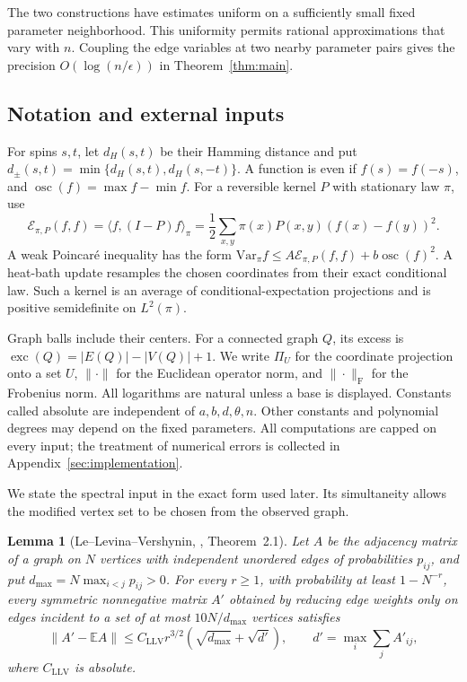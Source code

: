 \documentclass[11pt]{article}
\newcommand{\Var}{\mathrm{Var}}
\def\E{\mathbb{E}}
\newtheorem{lemma}[thm]{Lemma}
\numberwithin{equation}{section}
\begin{document}
The two constructions have estimates uniform on a sufficiently small fixed parameter neighborhood. This uniformity permits rational approximations that vary with $n$. Coupling the edge variables at two nearby parameter pairs gives the precision $O(\log(n/\epsilon))$ in Theorem~\ref{thm:main}.

\subsection{Notation and external inputs}

For spins $s,t$, let $d_H(s,t)$ be their Hamming distance and put
$d_\pm(s,t)=\min\{d_H(s,t),d_H(s,-t)\}$. A function is even if $f(s)=f(-s)$, and $\operatorname{osc}(f)=\max f-\min f$. For a reversible kernel $P$ with stationary law $\pi$, use
\[
 \mathcal E_{\pi,P}(f,f)
 =\langle f,(I-P)f\rangle_\pi
 =\frac12\sum_{x,y}\pi(x)P(x,y)(f(x)-f(y))^2.
\]
A weak Poincar\'e inequality has the form
$\Var_\pi f\le A\mathcal E_{\pi,P}(f,f)+b\operatorname{osc}(f)^2$.
A heat-bath update resamples the chosen coordinates from their exact conditional law. Such a kernel is an average of conditional-expectation projections and is positive semidefinite on $L^2(\pi)$.

Graph balls include their centers. For a connected graph $Q$, its excess is $\operatorname{exc}(Q)=|E(Q)|-|V(Q)|+1$. We write $\Pi_U$ for the coordinate projection onto a set $U$, $\|\cdot\|$ for the Euclidean operator norm, and $\|\cdot\|_{\mathrm F}$ for the Frobenius norm. All logarithms are natural unless a base is displayed. Constants called absolute are independent of $a,b,d,\theta,n$. Other constants and polynomial degrees may depend on the fixed parameters. All computations are capped on every input; the treatment of numerical errors is collected in Appendix~\ref{sec:implementation}.

We state the spectral input in the exact form used later. Its simultaneity allows the modified vertex set to be chosen from the observed graph.

\begin{lemma}[Le--Levina--Vershynin, \cite{LLV17}, Theorem~2.1]\label{ref:llv}
Let $A$ be the adjacency matrix of a graph on $N$ vertices with independent unordered edges of probabilities $p_{ij}$, and put $d_{\max}=N\max_{i<j}p_{ij}>0$. For every $r\ge1$, with probability at least $1-N^{-r}$, every symmetric nonnegative matrix $A'$ obtained by reducing edge weights only on edges incident to a set of at most $10N/d_{\max}$ vertices satisfies
\[
 \|A'-\E A\|\le C_{\mathrm{LLV}}r^{3/2}
          (\sqrt{d_{\max}}+\sqrt{d'}),
 \qquad d'=\max_i\sum_j A'_{ij},
\]
where $C_{\mathrm{LLV}}$ is absolute.
\end{lemma}
\end{document}
